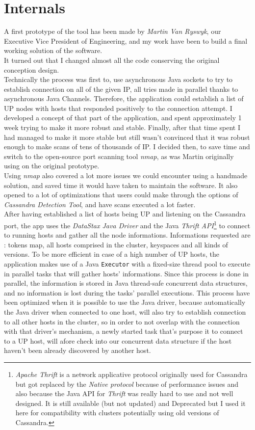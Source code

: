 \documentclass[a4paper]{report}
\newcommand{\djd}{\emph{DataStax Java Driver\xspace}}
\begin{document}
\section{Internals}
A first prototype of the tool has been made by \emph{Martin Van Ryswyk}, our Executive Vice President of Engineering, and my work have been to build a final working solution of the software.\\
It turned out that I changed almost all the code conserving the original conception design.\\ Technically the process was first to, use asynchronous Java sockets to try to establish connection on all of the given IP, all tries made in parallel thanks to asynchronous Java Channels. Therefore, the application could establish a list of UP nodes with hosts that responded positively to the connection attempt. I developed a concept of that part of the application, and spent approximately 1 week trying to make it more robust and stable. Finally, after that time spent I had managed to make it more stable but still wasn't convinced that it was robust enough to make scans of tens of thousands of IP. I decided then, to save time and switch to the open-source port scanning tool \emph{nmap}, as was Martin originally using on the original prototype. \\
Using \emph{nmap} also covered a lot more issues we could encounter using a handmade solution, and saved time it would have taken to maintain the software. It also opened to a lot of optimizations that users could make through the options of \emph{Cassandra Detection Tool}, and have scans executed a lot faster.\\
After having established a list of hosts being UP and listening on the Cassandra port, the app uses the \djd{} and the Java \emph{Thrift API}\footnote{\emph{Apache Thrift} is a network applicative protocol originally used for Cassandra but got replaced by the \emph{Native protocol} because of performance issues and also because the Java API for \emph{Thrift} was really hard to use and not well designed. It is still available (but not updated) and Deprecated but I used it here for compatibility with clusters potentially using old versions of Cassandra.} to connect to running hosts and gather all the node informations. Informations requested are : tokens map, all hosts comprised in the cluster, keyspaces and all kinds of versions. To be more efficient in case of a high number of UP hosts, the application makes use of a Java \verb;Executor; with a fixed-size thread pool to execute in parallel tasks that will gather hosts' informations. Since this process is done in parallel, the information is stored in Java thread-safe concurrent data structures, and no information is lost during the tasks' parallel executions. This process have been optimized when it is possible to use the Java driver, because automatically the Java driver when connected to one host, will also try to establish connection to all other hosts in the cluster, so in order to not overlap with the connection with that driver's mechanism, a newly started task that's purpose it to connect to a UP host, will afore check into our concurrent data structure if the host haven't been already discovered by another host.
\end{document}
